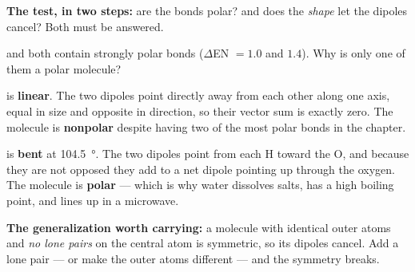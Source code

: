 \documentclass{apchem-worksheet}
\begin{document}
\begin{center}
\end{center}

\textbf{The test, in two steps:} are the bonds polar? and does the
\emph{shape} let the dipoles cancel? Both must be answered.

\begin{workedexample}
 and  both contain strongly polar bonds
($\Delta$EN $= 1.0$ and $1.4$). Why is only one of them a polar
molecule?

\textbf{} is \textbf{linear}. The two  dipoles point
directly away from each other along one axis, equal in size and opposite
in direction, so their vector sum is exactly zero. The molecule is
\textbf{nonpolar} despite having two of the most polar bonds in the
chapter.

\textbf{} is \textbf{bent} at \SI{104.5}{\degree}. The two
 dipoles point from each H toward the O, and because they are not
opposed they add to a net dipole pointing up through the oxygen. The
molecule is \textbf{polar} --- which is why water dissolves salts,
has a high boiling point, and lines up in a microwave.

\textbf{The generalization worth carrying:} a molecule with identical
outer atoms and \emph{no lone pairs} on the central atom is symmetric,
so its dipoles cancel. Add a lone pair --- or make the outer atoms
different --- and the symmetry breaks.
\end{workedexample}
\end{document}
